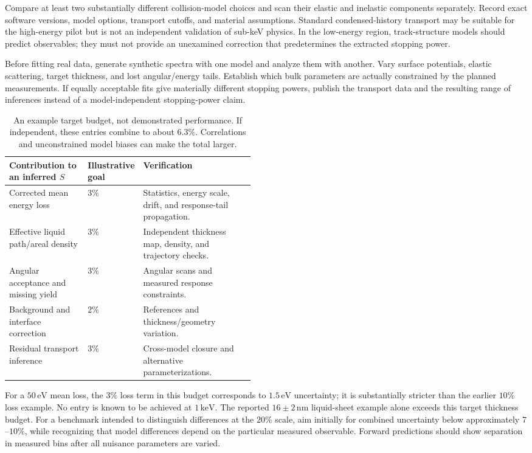 \documentclass[11pt,letterpaper]{article}
\newcommand{\eV}{\,\mathrm{eV}}
\newcommand{\keV}{\,\mathrm{keV}}
\newcommand{\nm}{\,\mathrm{nm}}
\begin{document}
Compare at least two substantially different collision-model choices and scan their elastic and
inelastic components separately. Record exact software versions, model options, transport cutoffs,
and material assumptions. Standard condensed-history transport may be suitable for the high-energy
pilot but is not an independent validation of sub-keV physics. In the low-energy region, track-structure
models should predict observables; they must not provide an unexamined correction that predetermines
the extracted stopping power.

Before fitting real data, generate synthetic spectra with one model and analyze them with another.
Vary surface potentials, elastic scattering, target thickness, and lost angular/energy tails. Establish
which bulk parameters are actually constrained by the planned measurements. If equally acceptable
fits give materially different stopping powers, publish the transport data and the resulting range of
inferences instead of a model-independent stopping-power claim.

\begin{table}[htbp]
\small
\begin{tabularx}{\linewidth}{@{}p{0.32\linewidth}p{0.15\linewidth}Y@{}}
\toprule
Contribution to an inferred $S$ & Illustrative goal & Verification \\
\midrule
Corrected mean energy loss & $3\%$ & Statistics, energy scale, drift, and response-tail propagation. \\
Effective liquid path/areal density & $3\%$ & Independent thickness map, density, and trajectory checks. \\
Angular acceptance and missing yield & $3\%$ & Angular scans and measured response constraints. \\
Background and interface correction & $2\%$ & References and thickness/geometry variation. \\
Residual transport inference & $3\%$ & Cross-model closure and alternative parameterizations. \\
\bottomrule
\end{tabularx}
\caption{An example target budget, not demonstrated performance. If independent, these entries
combine to about $6.3\%$. Correlations and unconstrained model biases can make the total larger.}
\end{table}

For a $50\eV$ mean loss, the $3\%$ loss term in this budget corresponds to $1.5\eV$ uncertainty;
it is substantially stricter than the earlier $10\%$ loss example. No entry is known to be achieved
at $1\keV$. The reported $16\pm2\nm$ liquid-sheet example alone exceeds this target thickness
budget. For a benchmark intended to distinguish differences at the $20\%$ scale, aim initially for
combined uncertainty below approximately $7$--$10\%$, while recognizing that model differences
depend on the particular measured observable. Forward predictions should show separation in
measured bins after all nuisance parameters are varied.
\end{document}
